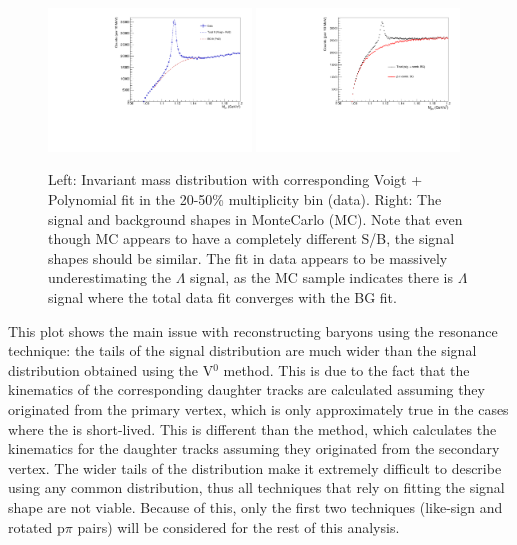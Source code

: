 \begin{figure}[ht]
    \centering
    \includegraphics[width=0.48\textwidth]{figures/analysis/lambda_mass_20_50_resonance_fit.pdf}
    \includegraphics[width=0.48\textwidth]{figures/analysis/lambda_mass_mc_real_bg.pdf}
    \caption{Left: Invariant mass distribution with corresponding Voigt + Polynomial fit in the 20-50\% multiplicity bin (data). Right: The signal and background shapes in MonteCarlo (MC). Note that even though MC appears to have a completely different S/B, the signal shapes should be similar. The fit in data appears to be massively underestimating the $\Lambda$ signal, as the MC sample indicates there is $\Lambda$ signal where the total data fit converges with the BG fit.}
    \label{fig:resonance_fitting_comp}
\end{figure}

This plot shows the main issue with reconstructing \lmb baryons using the resonance technique: the tails of the signal distribution are much wider than the signal distribution obtained using the V$^0$ method. This is due to the fact that the kinematics of the corresponding daughter tracks are calculated assuming they originated from the primary vertex, which is only approximately true in the cases where the \lmb is short-lived. This is different than the \vz method, which calculates the kinematics for the daughter tracks assuming they originated from the secondary vertex. The wider tails of the distribution make it extremely difficult to describe using any common distribution, thus all techniques that rely on fitting the signal shape are not viable. Because of this, only the first two techniques (like-sign and rotated p$\pi$ pairs) will be considered for the rest of this analysis.

